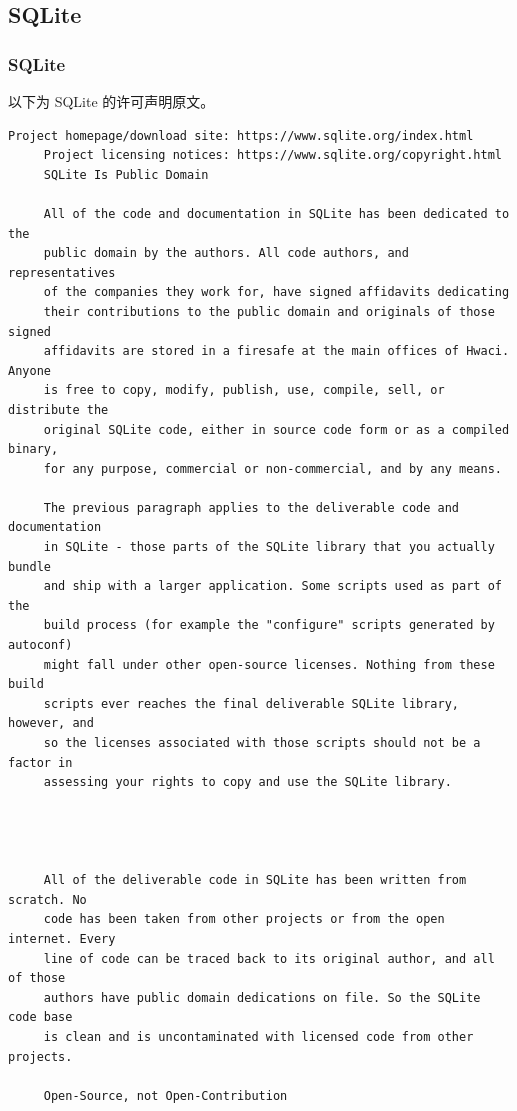 \subsection{SQLite}
\subsubsection*{SQLite}

以下为 SQLite 的许可声明原文。

\begin{lstlisting}[basicstyle=\ttfamily\footnotesize,breaklines=true]
     Project homepage/download site: https://www.sqlite.org/index.html
     Project licensing notices: https://www.sqlite.org/copyright.html
     SQLite Is Public Domain

     All of the code and documentation in SQLite has been dedicated to the
     public domain by the authors. All code authors, and representatives
     of the companies they work for, have signed affidavits dedicating
     their contributions to the public domain and originals of those signed
     affidavits are stored in a firesafe at the main offices of Hwaci. Anyone
     is free to copy, modify, publish, use, compile, sell, or distribute the
     original SQLite code, either in source code form or as a compiled binary,
     for any purpose, commercial or non-commercial, and by any means.

     The previous paragraph applies to the deliverable code and documentation
     in SQLite - those parts of the SQLite library that you actually bundle
     and ship with a larger application. Some scripts used as part of the
     build process (for example the "configure" scripts generated by autoconf)
     might fall under other open-source licenses. Nothing from these build
     scripts ever reaches the final deliverable SQLite library, however, and
     so the licenses associated with those scripts should not be a factor in
     assessing your rights to copy and use the SQLite library.




     All of the deliverable code in SQLite has been written from scratch. No
     code has been taken from other projects or from the open internet. Every
     line of code can be traced back to its original author, and all of those
     authors have public domain dedications on file. So the SQLite code base
     is clean and is uncontaminated with licensed code from other projects.

     Open-Source, not Open-Contribution


\end{lstlisting}
